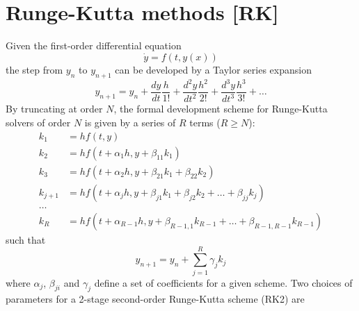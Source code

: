 \documentclass[a4paper]{article}
\begin{document}
\section{Runge-Kutta methods [RK]}\label{sec:rk}
Given the first-order differential equation
\begin{equation}\label{eq:firstorder}
\dot{y} = f(t,y(x))
\end{equation}
the step from $y_n$ to $y_{n+1}$ can be developed by a Taylor series expansion
\begin{equation*}
y_{n+1} = y_n + \frac{dy}{dt}\frac{h}{1!} + \frac{d^2y}{dt^2}\frac{h^2}{2!} + \frac{d^3y}{dt^3}\frac{h^3}{3!} + \ldots
\end{equation*}
By truncating at order $N$, the formal development scheme for Runge-Kutta solvers of order $N$ is given by a series of $R$ terms ($R \geq N$):
\begin{equation}\label{eq:rk_term}
\begin{split}
k_1 &= h f(t,y) \\
k_2 &= h f(t+\alpha_1 h, y+\beta_{11} k_1) \\
k_3 &= h f(t+\alpha_2 h, y+\beta_{21} k_1+\beta_{22} k_2) \\
k_{j+1} &= h f(t+\alpha_j h, y+\beta_{j1} k_1 + \beta_{j2} k_2 + \ldots + \beta_{jj} k_j) \\
\ldots \\
k_R &= h f(t+\alpha_{R-1} h, y+\beta_{R-1,1} k_{R-1} + \ldots + \beta_{R-1,R-1} k_{R-1})
\end{split}
\end{equation}
such that
\begin{equation*}
y_{n+1} = y_n + \sum_{j=1}^R \gamma_j k_j
\end{equation*}
where $\alpha_j$, $\beta_{ji}$ and $\gamma_j$ define a set of coefficients for a given scheme.
Two choices of parameters for a 2-stage second-order Runge-Kutta scheme (RK2) are
\end{document}
